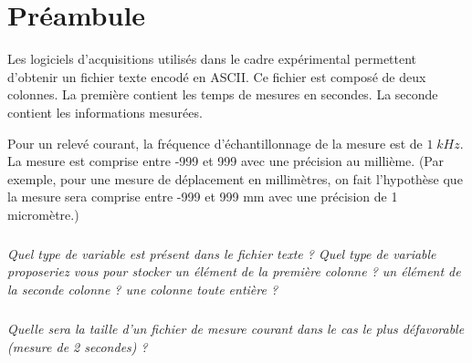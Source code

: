 \documentclass[10pt]{article}
\newif\ifprof
\begin{document}
\section{Préambule}
\ifprof
\else
Les logiciels d'acquisitions utilisés dans le cadre expérimental permettent d'obtenir un fichier texte encodé en ASCII. Ce fichier est composé de deux colonnes. La première contient les temps de mesures en secondes. La seconde contient les informations mesurées. 

Pour un relevé courant, la fréquence d'échantillonnage de la mesure est de $1\;kHz$. La mesure est comprise entre -999 et 999 avec une précision au millième. (Par exemple, pour une mesure de déplacement en millimètres, on fait l'hypothèse que la mesure sera comprise entre -999 et 999 mm avec une précision de 1 micromètre.)

\fi

\subparagraph{}
\textit{Quel type de variable est présent dans le fichier texte ? Quel type de variable proposeriez vous pour stocker un élément de la première colonne ? un élément de la seconde colonne ? une colonne toute entière ?}
\ifprof
\begin{corrige}
\begin{itemize}
\item Fichier texte : chaîne de caractères.
\item Élément de la première et de la seconde colonne : flottant (échantillonnage de 1 kHz $\Longrightarrow$ 1 mesure toutes les 0,001 seconde).
\item Colonne entière liste (ou tableau) de flottants. 
\end{itemize}
\end{corrige}
\else
\fi

\subparagraph{}
\textit{Quelle sera la taille d'un fichier de mesure courant dans le cas le plus défavorable (mesure de 2 secondes) ? }
\ifprof
\begin{corrige}
Codage ASCII donc 1 octet par caractère. 2 secondes à 1 $kHZ$ donc 2000 mesures. 
\begin{itemize}
\item Codage des secondes (0,001) : 5 octets
\item Espace : 1 octet
\item Codage de la mesure (999,999) : 7 octets
\item Retour à la ligne : 1 octet
\end{itemize}
On a donc approximativement 14 octets par ligne soit un fichier de 28 ko.
\end{corrige}
\else
\fi
\end{document}
